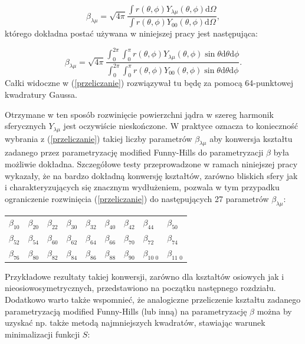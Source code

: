 \documentclass[a4paper,polish]{article}
\numberwithin{equation}{section}
\begin{document}
\begin{equation}
\beta_{\lambda \mu}=\sqrt{4\pi}\frac{\int r(\theta,\phi)Y_{\lambda \mu}
(\theta,\phi)\mathrm{d}\Omega}{\int r(\theta,\phi)Y_{0 0}(\theta,\phi)\mathrm{d}\Omega},
\end{equation}
którego dokładna postać używana w niniejszej pracy jest następująca:

\begin{equation}\label{przeliczanie}
\beta_{\lambda \mu}=\sqrt{4\pi}
\frac{\int_{0}^{2\pi}\int_{0}^{\pi}r(\theta,\phi)Y_{\lambda \mu}(\theta,\phi)\sin{\theta}\mathrm{d}\theta\mathrm{d}\phi}
{\int_{0}^{2\pi}\int_{0}^{\pi}r(\theta,\phi)Y_{0 0}(\theta,\phi)\sin{\theta}\mathrm{d}\theta\mathrm{d}\phi}.
\end{equation}
Całki widoczne w (\ref{przeliczanie}) rozwiązywał tu będę za pomocą 64-punktowej kwadratury Gaussa.

Otrzymane w ten sposób rozwinięcie powierzchni jądra w szereg harmonik sferycznych $Y_{\lambda \mu}$ jest oczywiście nieskończone. W praktyce oznacza to konieczność wybrania z (\ref{przeliczanie}) takiej liczby parametrów $\beta_{\lambda \mu}$ aby konwersja kształtu zadanego przez parametryzację modified Funny-Hills do parametryzacji $\beta$ była możliwie dokładna. Szczegółowe testy przeprowadzone w ramach niniejszej pracy wykazały, że na bardzo dokładną konwersję kształtów, zarówno bliskich sfery jak i charakteryzujących się znacznym wydłużeniem, pozwala w tym przypadku ograniczenie rozwinięcia (\ref{przeliczanie}) do następujących 27 parametrów $\beta_{\lambda \mu}$: \\

\begin{table}[h!]
\begin{center}
\begin{tabular}{cccccccll}
$\beta_{10}$ & $\beta_{20}$ & $\beta_{22}$ & $\beta_{30}$ & $\beta_{32}$ & $\beta_{40}$ & $\beta_{42}$ & $\beta_{44}$ & $\beta_{50}$\\
$\beta_{52}$ & $\beta_{54}$ & $\beta_{60}$ & $\beta_{62}$ & $\beta_{64}$ & $\beta_{66}$ & $\beta_{70}$ & $\beta_{72}$ & $\beta_{74}$\\
$\beta_{76}$ & $\beta_{80}$ & $\beta_{82}$ & $\beta_{84}$ & $\beta_{86}$ & $\beta_{88}$ & $\beta_{90}$ & $\beta_{10 \,\, 0}$ & $\beta_{11 \,\, 0}$ \\
\end{tabular}
\end{center}
\end{table}
Przykładowe rezultaty takiej konwersji, zarówno dla kształtów osiowych jak i nieosiowosymetrycznych, przedstawiono na początku następnego rozdziału. Dodatkowo warto także wspomnieć, że analogiczne przeliczenie kształtu zadanego parametryzacją modified Funny-Hills (lub inną) na parametryzację $\beta$ można by uzyskać np. także metodą najmniejszych kwadratów, stawiając warunek minimalizacji funkcji $S$:
\end{document}
